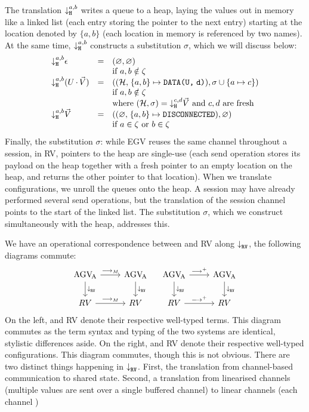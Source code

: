 \documentclass[acmsmall,review,anonymous]{acmart}
\begin{document}
The translation $\mtrh[a,b]{}$ writes a queue to a heap, laying the values out in memory like a linked list (each entry storing the pointer to the next entry) starting at the location denoted by $\{a,b\}$ (each location in memory is referenced by two names). At the same time, $\mtrh[a,b]{}$ constructs a substitution $\sigma$, which we will discuss below:
\[
  \begin{array}{lcl}
    \mtrh[a,b]{\gvVecEmp}
    & = & (\rvHeapEmp, \varnothing)
    \\ && \text{if }\tm{a},\tm{b}\notin\zeta
    \\
    \mtrh[a,b]{\parens{\tm{U}\gvVecAdd\gvVec{V}}}
    & = & ((\rvHeapData{\rvHeap{H}}{a}{b}{\rvMemData{U}{d}}), \sigma \cup \{\tm{a}\mapsto\tm{c}\})
    \\ && \text{if }\tm{a},\tm{b}\notin\zeta
    \\ && \text{where }(\rvHeap{H}, \sigma) = \mtrh[c,d]{\gvVec{V}}
          \text{ and }\tm{c},\tm{d}\text{ are fresh}
    \\
    \mtrh[a,b]{\gvVec{V}}
    & = & ((\rvHeapDisc{\rvHeapEmp}{a}{b}), \varnothing)
    \\ && \text{if }\tm{a}\in\zeta\text{ or }\tm{b}\in\zeta
  \end{array}
\]
Finally, the substitution $\sigma$: while EGV reuses the same channel throughout a session, in RV, pointers to the heap are single-use (each send operation stores its payload on the heap together with a fresh pointer to an empty location on the heap, and returns the other pointer to that location).
When we translate configurations, we unroll the queues onto the heap. A session may have already performed several send operations, but the translation of the session channel points to the start of the linked list. The substitution $\sigma$, which we construct simultaneously with the heap, addresses this.

We have an operational correspondence between \affineAGV and RV along $\mtr{}$, \ie the following diagrams commute:
\[
  \begin{tikzcd}
    \affineAGV
    \rar{\gvRedArrPure}
    \dar{\mtr{}}
    &
    \affineAGV
    \dar{\mtr{}}
    \\
    RV
    \rar{\gvRedArrPure}
    &
    RV
  \end{tikzcd}
  \quad
  \begin{tikzcd}
    \affineAGV
    \rar{\gvRedArr^{+}}
    \dar{\mtr{}}
    &
    \affineAGV
    \dar{\mtr{}}
    \\
    RV
    \rar{\gvRedArr^{+}}
    &
    RV
  \end{tikzcd}
\]
On the left, \affineAGV and RV denote their respective well-typed terms. This diagram commutes as the term syntax and typing of the two systems are identical, stylistic differences aside.
On the right, \affineAGV and RV denote their respective well-typed configurations. This diagram commutes, though this is not obvious.
There are two distinct things happening in $\mtr{}$. First, the translation from channel-based communication to shared state. Second, a translation from linearised channels (multiple values are sent over a single buffered channel) to linear channels (each channel )





\end{document}
